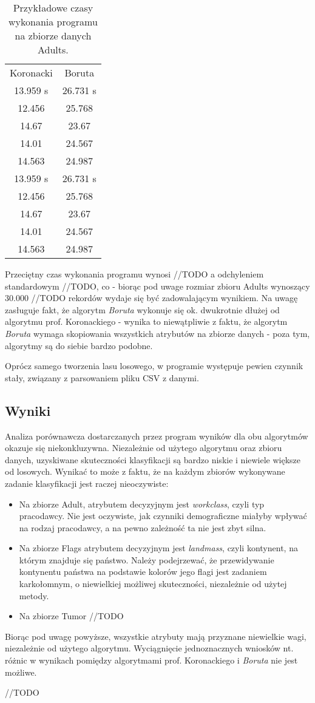 \documentclass{article}
\begin{document}
\begin{table} 
	\centering
	\begin{tabular}{|c|c|} \hline
		Koronacki & Boruta \\ 
		13.959 s & 26.731 s \\ 
		12.456 & 25.768 \\ 
		14.67 & 23.67 \\ 
		14.01 & 24.567 \\ 
		14.563 & 24.987 \\ 
		13.959 s & 26.731 s \\ 
		12.456 & 25.768 \\ 
		14.67 & 23.67 \\ 
		14.01 & 24.567 \\ 
		14.563 & 24.987 \\ \hline
	\end{tabular}
\caption{Przykładowe czasy wykonania programu na zbiorze danych Adults.}
\label{tab:times}
\end{table}

Przeciętny czas wykonania programu wynosi //TODO a odchyleniem standardowym //TODO, co - biorąc pod uwage rozmiar zbioru Adults wynoszący 30.000 //TODO rekordów wydaje się być zadowalającym wynikiem. Na uwagę zasługuje fakt, że algorytm \emph{Boruta} wykonuje się ok. dwukrotnie dłużej od algorytmu prof. Koronackiego - wynika to niewątpliwie z faktu, że algorytm \emph{Boruta} wymaga skopiowania wszystkich atrybutów na zbiorze danych - poza tym, algorytmy są do siebie bardzo podobne. 

Oprócz samego tworzenia lasu losowego, w programie występuje pewien czynnik stały, związany z parsowaniem pliku CSV z danymi. 

\subsection{Wyniki}

Analiza porównawcza dostarczanych przez program wyników dla obu algorytmów okazuje się niekonkluzywna. Niezależnie od użytego algorytmu oraz zbioru danych, uzyskiwane skuteczności klasyfikacji są bardzo niskie i niewiele większe od losowych. Wynikać to może z faktu, że na każdym zbiorów wykonywane zadanie klasyfikacji jest raczej nieoczywiste:
\begin{itemize}
	\item Na zbiorze Adult, atrybutem decyzyjnym jest \emph{workclass}, czyli typ pracodawcy. Nie jest oczywiste, jak czynniki demograficzne miałyby wpływać na rodzaj pracodawcy, a na pewno zależność ta nie jest zbyt silna. 
	\item Na zbiorze Flags atrybutem decyzyjnym jest \emph{landmass}, czyli kontynent, na którym znajduje się państwo. Należy podejrzewać, że przewidywanie kontynentu państwa na podstawie kolorów jego flagi jest zadaniem karkołomnym, o niewielkiej możliwej skuteczności, niezależnie od użytej metody. 
	\item Na zbiorze Tumor //TODO
\end{itemize}

Biorąc pod uwagę powyższe, wszystkie atrybuty mają przyznane niewielkie wagi, niezależnie od użytego algorytmu. Wyciągnięcie jednoznacznych wniosków nt. różnic w wynikach pomiędzy algorytmami prof. Koronackiego i \emph{Boruta} nie jest możliwe. 

//TODO
\end{document}

